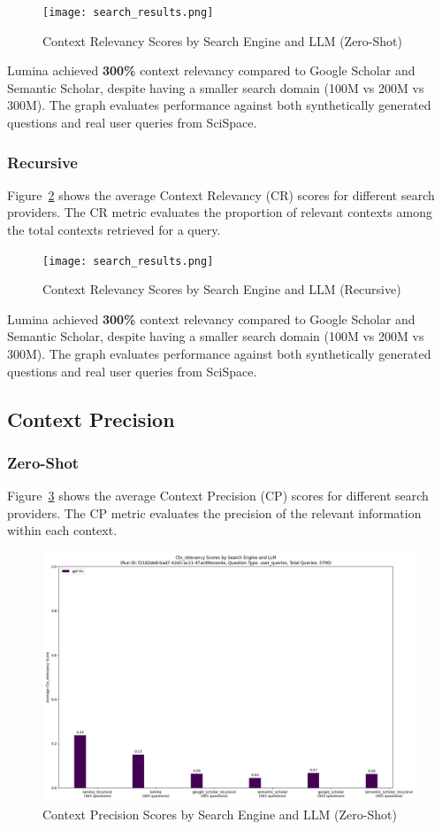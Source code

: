 \documentclass{article}
\begin{document}
\begin{multicols}{2}
\begin{figure}[h]
    \centering
    \texttt{[image: search\_results.png]}
    \caption{Context Relevancy Scores by Search Engine and LLM (Zero-Shot)}
    \label{fig:search_results_zeroshot}
\end{figure}

Lumina achieved \textbf{300\%} context relevancy compared to Google Scholar and Semantic Scholar, despite having a smaller search domain (100M vs 200M vs 300M). The graph evaluates performance against both synthetically generated questions and real user queries from SciSpace. 

\subsubsection{Recursive}

Figure~\ref{fig:search_results_recursive} shows the average Context Relevancy (CR) scores for different search providers. The CR metric evaluates the proportion of relevant contexts among the total contexts retrieved for a query.

\begin{figure}[h]
    \centering
    \texttt{[image: search\_results.png]}
    \caption{Context Relevancy Scores by Search Engine and LLM (Recursive)}
    \label{fig:search_results_recursive}
\end{figure}

Lumina achieved \textbf{300\%} context relevancy compared to Google Scholar and Semantic Scholar, despite having a smaller search domain (100M vs 200M vs 300M). The graph evaluates performance against both synthetically generated questions and real user queries from SciSpace. 

\subsection{Context Precision}
\subsubsection{Zero-Shot}

Figure~\ref{fig:recursive_results_zeroshot} shows the average Context Precision (CP) scores for different search providers. The CP metric evaluates the precision of the relevant information within each context.

\begin{figure}[h]
    \centering
    \includegraphics[width=0.45\columnwidth]{recursive_results.png}
    \caption{Context Precision Scores by Search Engine and LLM (Zero-Shot)}
    \label{fig:recursive_results_zeroshot}
\end{figure}


\end{multicols}
\end{document}
